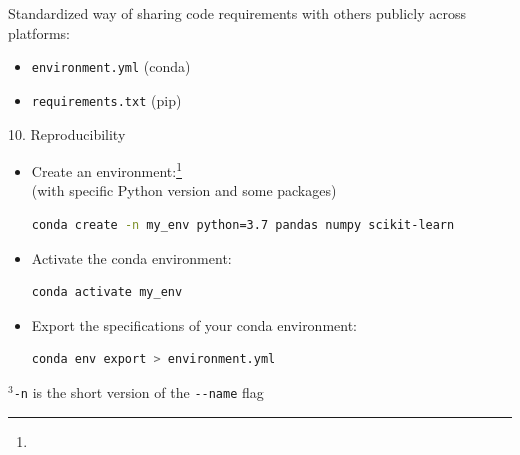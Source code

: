 
\begin{vbframe}{}

\vfill

Standardized way of sharing code requirements with others publicly across platforms:

\vspace{.3cm}

\begin{itemize}
	\item \texttt{environment.yml} (conda)
	\item \texttt{requirements.txt} (pip)
\end{itemize}

\vfill

\end{vbframe}


\begin{vbframe}{10. Reproducibility}

\vfill

\begin{itemize}
	\item Create an environment:\footnote{}\\
  (with specific Python version and some packages)
\begin{lstlisting}[language=bash,basicstyle=\tiny\ttfamily]
conda create -n my_env python=3.7 pandas numpy scikit-learn
\end{lstlisting}
	\item Activate the conda environment:
\begin{lstlisting}[language=bash]
conda activate my_env
\end{lstlisting}
	\item Export the specifications of your conda environment:
\begin{lstlisting}[language=bash]
conda env export > environment.yml
\end{lstlisting}
\end{itemize}

\vfill

\footnotesize $^3$\texttt{-n} is the short version of the \mbox{\texttt{-}}\texttt{-name} flag

\end{vbframe}


